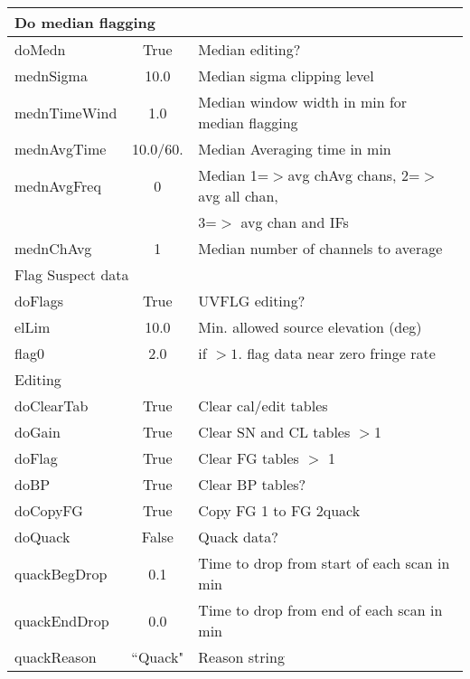 \documentclass[11pt]{article}
\begin{document}
\begin{center}
\begin{tabular}{|l|c|l|}

\hline
\multicolumn{3}{|l|}{Do median flagging} \\
\hline
doMedn & True & Median editing? \\
mednSigma & 10.0 & Median sigma clipping level \\
mednTimeWind & 1.0 & Median window width in min for median flagging \\
mednAvgTime & 10.0/60. & Median Averaging time in min \\
mednAvgFreq & 0 & Median 1=$>$avg chAvg chans, 2=$>$avg all chan, \\
 & & 3=$>$ avg chan and IFs \\
mednChAvg & 1 & Median number of channels to average \\

\hline
\multicolumn{3}{|l|}{Flag Suspect data} \\
\hline
doFlags & True & UVFLG editing? \\
elLim   & 10.0 & Min. allowed source elevation (deg)\\
flag0   & 2.0  & if $> 1$. flag data near zero fringe rate \\

\hline
\multicolumn{3}{|l|}{Editing} \\
\hline
doClearTab & True & Clear cal/edit tables \\
doGain & True & Clear SN and CL tables $>$1 \\
doFlag & True & Clear FG tables $>$ 1 \\
doBP & True & Clear BP tables? \\
doCopyFG & True & Copy FG 1 to FG 2quack \\
doQuack & False & Quack data? \\
quackBegDrop & 0.1 & Time to drop from start of each scan in min \\
quackEndDrop & 0.0 & Time to drop from end of each scan in min \\
quackReason & ``Quack" & Reason string \\


\end{tabular}
\end{center}
\end{document}
